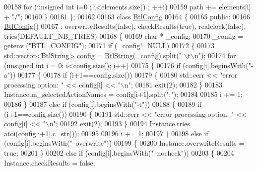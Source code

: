 \begin{DoxyCode}
00158         \textcolor{keywordflow}{for} (\textcolor{keywordtype}{unsigned} \textcolor{keywordtype}{int} i=0 ; i<elements.size() ; ++i)
00159             path += elements[i] + \textcolor{stringliteral}{"/"};
00160     \}
00161 \};
00162 
00163 \textcolor{keyword}{class }\hyperlink{class_btl_config}{BtlConfig}
00164 \{
00165 \textcolor{keyword}{public}:
00166   \hyperlink{class_btl_config}{BtlConfig}()
00167     : overwriteResults(\textcolor{keyword}{false}), checkResults(\textcolor{keyword}{true}), realclock(\textcolor{keyword}{false}), tries(DEFAULT\_NB\_TRIES)
00168   \{
00169     \textcolor{keywordtype}{char} * \_config;
00170     \_config = getenv (\textcolor{stringliteral}{"BTL\_CONFIG"});
00171     \textcolor{keywordflow}{if} (\_config!=NULL)
00172     \{
00173       std::vector<BtlString> \hyperlink{structconfig__s}{config} = \hyperlink{class_btl_string}{BtlString}(\_config).split(\textcolor{stringliteral}{" \(\backslash\)t\(\backslash\)n"});
00174       \textcolor{keywordflow}{for} (\textcolor{keywordtype}{unsigned} \textcolor{keywordtype}{int} i = 0; i<config.size(); i++)
00175       \{
00176         \textcolor{keywordflow}{if} (config[i].beginsWith(\textcolor{stringliteral}{"-a"}))
00177         \{
00178           \textcolor{keywordflow}{if} (i+1==config.size())
00179           \{
00180             std::cerr << \textcolor{stringliteral}{"error processing option: "} << config[i] << \textcolor{stringliteral}{"\(\backslash\)n"};
00181             exit(2);
00182           \}
00183           Instance.m\_selectedActionNames = config[i+1].split(\textcolor{stringliteral}{":"});
00184 
00185           i += 1;
00186         \}
00187         \textcolor{keywordflow}{else} \textcolor{keywordflow}{if} (config[i].beginsWith(\textcolor{stringliteral}{"-t"}))
00188         \{
00189           \textcolor{keywordflow}{if} (i+1==config.size())
00190           \{
00191             std::cerr << \textcolor{stringliteral}{"error processing option: "} << config[i] << \textcolor{stringliteral}{"\(\backslash\)n"};
00192             exit(2);
00193           \}
00194           Instance.tries = atoi(config[i+1].c\_str());
00195 
00196           i += 1;
00197         \}
00198         \textcolor{keywordflow}{else} \textcolor{keywordflow}{if} (config[i].beginsWith(\textcolor{stringliteral}{"--overwrite"}))
00199         \{
00200           Instance.overwriteResults = \textcolor{keyword}{true};
00201         \}
00202         \textcolor{keywordflow}{else} \textcolor{keywordflow}{if} (config[i].beginsWith(\textcolor{stringliteral}{"--nocheck"}))
00203         \{
00204           Instance.checkResults = \textcolor{keyword}{false};

\end{DoxyCode}
